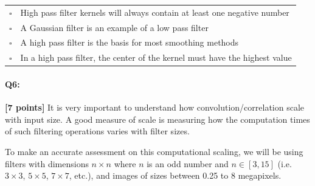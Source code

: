 \begin{enumerate}[(a)]
\begin{tabular}[h]{ll}
$\square$ & High pass filter kernels will always contain at least one negative number \\
$\square$ & A Gaussian filter is an example of a low pass filter \\
$\square$ & A high pass filter is the basis for most smoothing methods \\
$\square$ & In a high pass filter, the center of the kernel must have the highest value \\
\end{tabular}

\end{enumerate}




\pagebreak
\paragraph{Q6:} \textbf{[7 points]}
    It is very important to understand how convolution/correlation scale with input size. A good measure of scale is measuring how the computation times of such filtering operations varies with filter sizes.
    
    To make an accurate assessment on this computational scaling, we will be using filters with dimensions $n \times n$ where $n$ is an odd number and $n \in [3, 15]$ (i.e. $3\times3$, $5\times5$, $7\times7$, etc.), and images of sizes between 0.25 to 8 megapixels.

